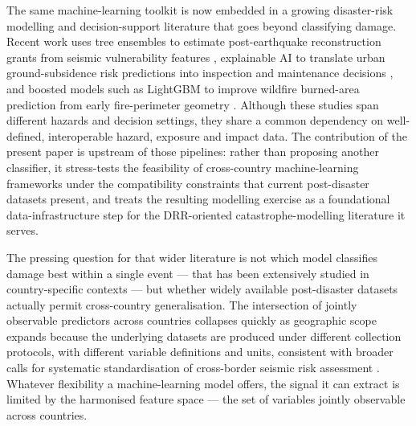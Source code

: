 \documentclass[11pt,a4paper]{article}
\begin{document}
The same machine-learning toolkit is now embedded in a growing disaster-risk modelling and decision-support literature that goes beyond classifying damage. Recent work uses tree ensembles to estimate post-earthquake reconstruction grants from seismic vulnerability features \citep{rosso2026grants}, explainable AI to translate urban ground-subsidence risk predictions into inspection and maintenance decisions \citep{lee2026subsidence}, and boosted models such as LightGBM to improve wildfire burned-area prediction from early fire-perimeter geometry \citep{kim2026wildfireifd, ke2017lightgbm}. Although these studies span different hazards and decision settings, they share a common dependency on well-defined, interoperable hazard, exposure and impact data. The contribution of the present paper is upstream of those pipelines: rather than proposing another classifier, it stress-tests the feasibility of cross-country machine-learning frameworks under the compatibility constraints that current post-disaster datasets present, and treats the resulting modelling exercise as a foundational data-infrastructure step for the DRR-oriented catastrophe-modelling literature it serves.

The pressing question for that wider literature is not which model classifies damage best within a single event --- that has been extensively studied in country-specific contexts \citep{ghimire2022nepal, hariri2025turkiye} --- but whether widely available post-disaster datasets actually permit cross-country generalisation. The intersection of jointly observable predictors across countries collapses quickly as geographic scope expands because the underlying datasets are produced under different collection protocols, with different variable definitions and units, consistent with broader calls for systematic standardisation of cross-border seismic risk assessment \citep{rosti2021aedes, fakhruddin2022riskinformed, babic2025crossborder}. Whatever flexibility a machine-learning model offers, the signal it can extract is limited by the harmonised feature space --- the set of variables jointly observable across countries.
\end{document}
